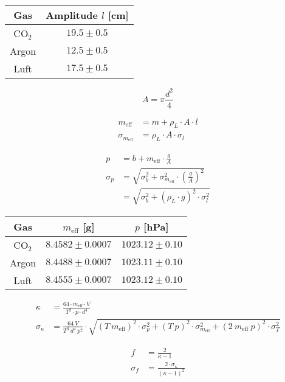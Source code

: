 \documentclass[12pt,a4paper,titlepage,headinclude,bibtotoc]{scrartcl}
\begin{document}
\begin{table}[!hbt]
	\centering
	\begin{tabular}{|c|c|}
		\hline
		Gas & Amplitude $l$ [cm]\\
		\hline
		\hline
		CO$_2$& $19.5\pm0.5$\\
		Argon & $12.5\pm0.5$\\
		Luft & $17.5\pm0.5$\\
		\hline
	\end{tabular}
\end{table}

$$ A = \pi\frac{d^2}{4}$$

\begin{align}
	m_{\text{eff}}&= m + \rho_L \cdot A \cdot l\\
	\sigma_{m_\text{eff}}&=\rho_L \cdot A \cdot \sigma_l
\end{align}

\begin{align}
	p &= b + m_{\text{eff}} \cdot \frac{g}{A}\\
	\sigma_p &= \sqrt{\sigma_b^2+\sigma_{m_{\text{eff}}}^2 \cdot \left(\frac{g}{A}\right)^2}\\
	&=\sqrt{\sigma_b^2+\left(\rho_L \cdot g\right)^2 \cdot \sigma_l^2 }
\end{align}

\begin{table}[!hbt]
	\centering
	\begin{tabular}{|c|c|c|}
		\hline
		Gas & $m_{\text{eff}}$ [g] & $p$ [hPa] \\
		\hline
		\hline
		CO$_2$ & $8.4582 \pm 0.0007$ & $1023.12 \pm 0.10$ \\
		Argon & $8.4488 \pm 0.0007$ & $1023.11 \pm 0.10$ \\
		Luft & $8.4555 \pm 0.0007$ & $1023.12 \pm 0.10$ \\
		\hline
	\end{tabular}
\end{table}


\begin{align}
	\kappa&=\frac{64 \cdot m_{\text{eff}}\cdot V }{T^{2} \cdot p \cdot d^{4}}\\
	\sigma_{\kappa}&=\frac{64 ~ V}{T^{3} ~ d^{4} ~ p^{2}} \cdot \sqrt{\left(T ~ m_{\text{eff}}\right)^2 \cdot \sigma_{p}^{2} + \left(T ~ p\right)^2 \cdot \sigma_{m_{\text{eff}}}^{2} + \left(2~m_{\text{eff}}~p\right)^{2} \cdot \sigma_{T}^{2}}
\end{align}

\begin{align}
	f&=\frac{2}{\kappa - 1}\\
	\sigma_{f}&=\frac{2 \cdot \sigma_{\kappa}}{\left(\kappa - 1\right)^{2}}
\end{align}
\end{document}
